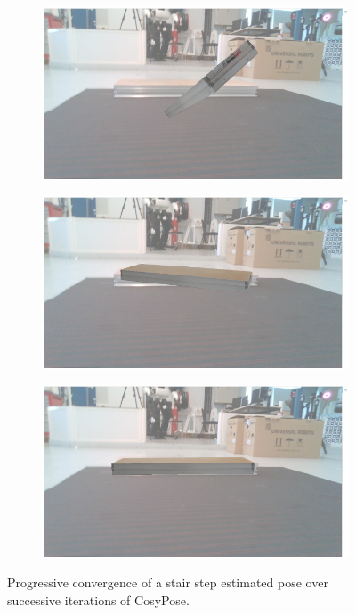 \begin{figure}[]

    \begin{subfigure}{.5\textwidth} %
        \centering
        \includegraphics[width=.9\linewidth]{figures/cosyslam/convergence_1.png}  %
    \end{subfigure}
    \begin{subfigure}{.5\textwidth}
        \centering
        \includegraphics[width=.9\linewidth]{figures/cosyslam/convergence_2.png}  
    \end{subfigure}

    \label{fig:fig}
    \begin{subfigure}{\textwidth}
        \centering
        \includegraphics[width=.45\linewidth]{figures/cosyslam/convergence_3.png}   %
        
    \end{subfigure}
    \caption{\label{fig:cosypose-convergence} Progressive convergence of a stair step estimated pose over successive iterations of CosyPose.}
\end{figure}


